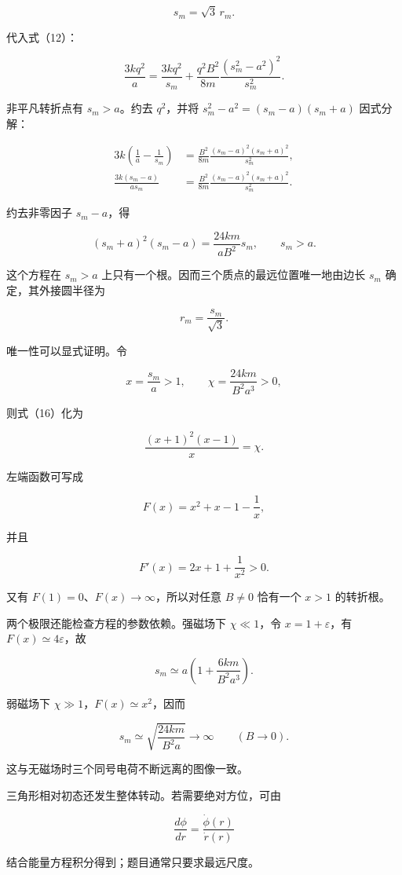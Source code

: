 \documentclass[12pt,a4paper,UTF8]{ctexart}
\begin{document}
\[
s_m=\sqrt3\,r_m.
\tag{13}
\]

代入式（12）：

\[
\frac{3kq^2}{a}
=\frac{3kq^2}{s_m}
+\frac{q^2B^2}{8m}
\frac{(s_m^2-a^2)^2}{s_m^2}.
\tag{14}
\]

非平凡转折点有 \(s_m>a\)。约去 \(q^2\)，并将
\(s_m^2-a^2=(s_m-a)(s_m+a)\) 因式分解：

\[
\begin{aligned}
3k\left(\frac1a-\frac1{s_m}\right)
&=\frac{B^2}{8m}
\frac{(s_m-a)^2(s_m+a)^2}{s_m^2},\\
\frac{3k(s_m-a)}{as_m}
&=\frac{B^2}{8m}
\frac{(s_m-a)^2(s_m+a)^2}{s_m^2}.
\end{aligned}
\tag{15}
\]

约去非零因子 \(s_m-a\)，得

\[
\boxed{
(s_m+a)^2(s_m-a)
=\frac{24km}{aB^2}s_m,
\qquad s_m>a
}.
\tag{16}
\]

这个方程在 \(s_m>a\) 上只有一个根。因而三个质点的最远位置唯一地由边长
\(s_m\) 确定，其外接圆半径为

\[
\boxed{r_m=\frac{s_m}{\sqrt3}}.
\tag{17}
\]

唯一性可以显式证明。令

\[
x=\frac{s_m}{a}>1,
\qquad
\chi=\frac{24km}{B^2a^3}>0,
\]

则式（16）化为

\[
\frac{(x+1)^2(x-1)}x=\chi.
\]

左端函数可写成

\[
F(x)=x^2+x-1-\frac1x,
\]

并且

\[
F'(x)=2x+1+\frac1{x^2}>0.
\]

又有 \(F(1)=0\)、\(F(x)\to\infty\)，所以对任意 \(B\ne0\) 恰有一个
\(x>1\) 的转折根。

两个极限还能检查方程的参数依赖。强磁场下 \(\chi\ll1\)，令
\(x=1+\varepsilon\)，有 \(F(x)\simeq4\varepsilon\)，故

\[
s_m\simeq a\left(1+\frac{6km}{B^2a^3}\right).
\]

弱磁场下 \(\chi\gg1\)，\(F(x)\simeq x^2\)，因而

\[
s_m\simeq\sqrt{\frac{24km}{B^2a}}\longrightarrow\infty
\qquad(B\to0).
\]

这与无磁场时三个同号电荷不断远离的图像一致。

三角形相对初态还发生整体转动。若需要绝对方位，可由

\[
\frac{d\phi}{dr}=\frac{\dot\phi(r)}{\dot r(r)}
\tag{18}
\]

结合能量方程积分得到；题目通常只要求最远尺度。
\end{document}
